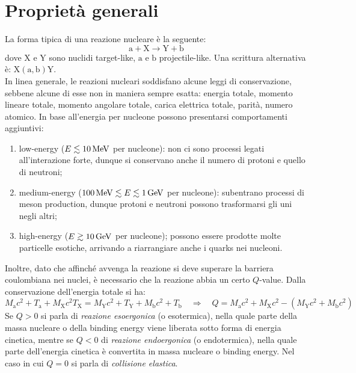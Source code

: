
\section{Proprietà generali}

La forma tipica di una reazione nucleare è la seguente:
\begin{equation*}
	\mathrm{a} + \mathrm{X} \rightarrow \mathrm{Y} + \mathrm{b}
\end{equation*}
dove $ \mathrm{X} $ e $ \mathrm{Y} $ sono nuclidi target-like, $ \mathrm{a} $ e $ \mathrm{b} $ projectile-like. Una scrittura alternativa è: $ \mathrm{X} \left( \mathrm{a},\mathrm{b} \right) \mathrm{Y} $.\\
In linea generale, le reazioni nucleari soddisfano alcune leggi di conservazione, sebbene alcune di esse non in maniera sempre esatta: energia totale, momento lineare totale, momento angolare totale, carica elettrica totale, parità, numero atomico. In base all'energia per nucleone possono presentarsi comportamenti aggiuntivi:
\begin{enumerate}
	\item low-energy ($ E \lesssim 10\,\mathrm{MeV} $ per nucleone): non ci sono processi legati all'interazione forte, dunque si conservano anche il numero di protoni e quello di neutroni;
	\item medium-energy ($ 100\,\mathrm{MeV} \lesssim E \lesssim 1\,\mathrm{GeV} $ per nucleone): subentrano processi di meson production, dunque protoni e neutroni possono trasformarsi gli uni negli altri;
	\item high-energy ($ E \gtrsim 10\,\mathrm{GeV} $ per nucleone); possono essere prodotte molte particelle esotiche, arrivando a riarrangiare anche i quarks nei nucleoni.
\end{enumerate}
Inoltre, dato che affinché avvenga la reazione si deve superare la barriera coulombiana nei nuclei, è necessario che la reazione abbia un certo $ Q $-value. Dalla conservazione dell'energia totale si ha:
\begin{equation*}
	M_{\mathrm{a}} c^2 + T_{\mathrm{a}} + M_{\mathrm{X}} c^2 T_{\mathrm{X}} = M_{\mathrm{Y}} c^2 + T_{\mathrm{Y}} + M_{\mathrm{b}} c^2 + T_{\mathrm{b}}
	\quad \Rightarrow \quad
	Q = M_{\mathrm{a}} c^2 + M_{\mathrm{X}} c^2 - \left( M_{\mathrm{Y}} c^2 + M_{\mathrm{b}} c^2 \right)
\end{equation*}
Se $ Q > 0 $ si parla di \textit{reazione esoergonica} (o esotermica), nella quale parte della massa nucleare o della binding energy viene liberata sotto forma di energia cinetica, mentre se $ Q < 0 $ di \textit{reazione endoergonica} (o endotermica), nella quale parte dell'energia cinetica è convertita in massa nucleare o binding energy. Nel caso in cui $ Q = 0 $ si parla di \textit{collisione elastica}.\\

